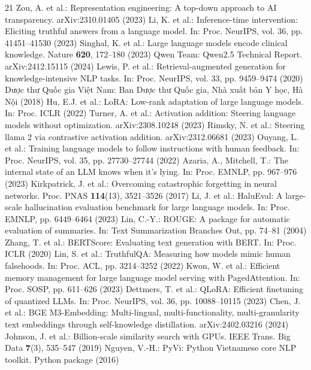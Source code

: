 \documentclass[runningheads]{llncs}
\newcommand{\vn}[1]{{\fontencoding{T5}\selectfont #1}}
\begin{document}
\begin{thebibliography}{21}
 Zou, A. et al.: Representation engineering: A top-down approach to AI transparency. arXiv:2310.01405 (2023)
 Li, K. et al.: Inference-time intervention: Eliciting truthful answers from a language model. In: Proc. NeurIPS, vol. 36, pp. 41451--41530 (2023)
 Singhal, K. et al.: Large language models encode clinical knowledge. Nature \textbf{620}, 172--180 (2023)
 Qwen Team: Qwen2.5 Technical Report. arXiv:2412.15115 (2024)
 Lewis, P. et al.: Retrieval-augmented generation for knowledge-intensive NLP tasks. In: Proc. NeurIPS, vol. 33, pp. 9459--9474 (2020)
 \vn{Dược thư Quốc gia Việt Nam}: \vn{Ban Dược thư Quốc gia, Nhà xuất bản Y học, Hà Nội} (2018)
 Hu, E.J. et al.: LoRA: Low-rank adaptation of large language models. In: Proc. ICLR (2022)
 Turner, A. et al.: Activation addition: Steering language models without optimization. arXiv:2308.10248 (2023)
 Rimsky, N. et al.: Steering llama 2 via contrastive activation addition. arXiv:2312.06681 (2023)
 Ouyang, L. et al.: Training language models to follow instructions with human feedback. In: Proc. NeurIPS, vol. 35, pp. 27730--27744 (2022)
 Azaria, A., Mitchell, T.: The internal state of an LLM knows when it's lying. In: Proc. EMNLP, pp. 967--976 (2023)
 Kirkpatrick, J. et al.: Overcoming catastrophic forgetting in neural networks. Proc. PNAS \textbf{114}(13), 3521--3526 (2017)
 Li, J. et al.: HaluEval: A large-scale hallucination evaluation benchmark for large language models. In: Proc. EMNLP, pp. 6449--6464 (2023)
 Lin, C.-Y.: ROUGE: A package for automatic evaluation of summaries. In: Text Summarization Branches Out, pp. 74--81 (2004)
 Zhang, T. et al.: BERTScore: Evaluating text generation with BERT. In: Proc. ICLR (2020)
 Lin, S. et al.: TruthfulQA: Measuring how models mimic human falsehoods. In: Proc. ACL, pp. 3214--3252 (2022)
 Kwon, W. et al.: Efficient memory management for large language model serving with PagedAttention. In: Proc. SOSP, pp. 611--626 (2023)
 Dettmers, T. et al.: QLoRA: Efficient finetuning of quantized LLMs. In: Proc. NeurIPS, vol. 36, pp. 10088--10115 (2023)
 Chen, J. et al.: BGE M3-Embedding: Multi-lingual, multi-functionality, multi-granularity text embeddings through self-knowledge distillation. arXiv:2402.03216 (2024)
 Johnson, J. et al.: Billion-scale similarity search with GPUs. IEEE Trans. Big Data \textbf{7}(3), 535--547 (2019)
 Nguyen, V.-H.: PyVi: Python Vietnamese core NLP toolkit. Python package (2016)
\end{thebibliography}
\end{document}

